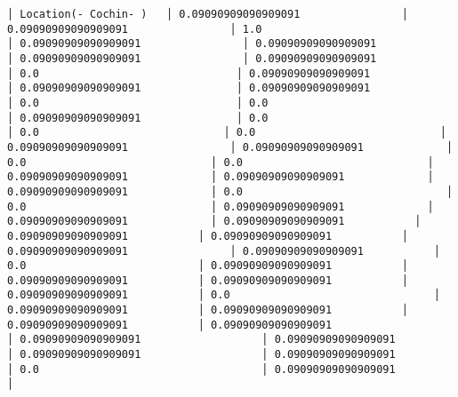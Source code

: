 \documentclass[11pt]{article}
\begin{document}
\begin{Verbatim}[commandchars=\\\{\}]
│ Location(- Cochin- )   │ 0.09090909090909091                │ 0.09090909090909091                │ 1.0                                │ 0.09090909090909091                │ 0.09090909090909091                │ 0.09090909090909091                │ 0.09090909090909091                │ 0.0                               │ 0.09090909090909091               │ 0.09090909090909091               │ 0.09090909090909091                │ 0.0                               │ 0.0                               │ 0.09090909090909091               │ 0.0                             │ 0.0                             │ 0.0                             │ 0.09090909090909091                │ 0.09090909090909091             │ 0.0                             │ 0.0                             │ 0.09090909090909091             │ 0.09090909090909091             │ 0.09090909090909091             │ 0.0                                │ 0.0                             │ 0.09090909090909091             │ 0.09090909090909091             │ 0.09090909090909091           │ 0.09090909090909091           │ 0.09090909090909091           │ 0.09090909090909091                │ 0.09090909090909091           │ 0.0                           │ 0.09090909090909091           │ 0.09090909090909091           │ 0.09090909090909091           │ 0.09090909090909091           │ 0.0                                │ 0.09090909090909091           │ 0.09090909090909091           │ 0.09090909090909091           │ 0.09090909090909091                   │ 0.09090909090909091                   │ 0.09090909090909091                   │ 0.09090909090909091                   │ 0.09090909090909091                   │ 0.0                                   │ 0.09090909090909091                   │

\end{Verbatim}
\end{document}
